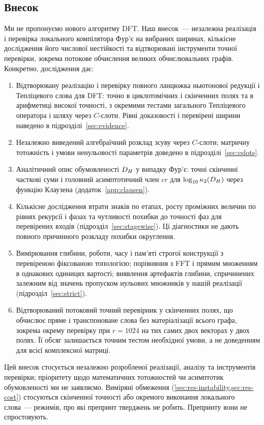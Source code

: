 \documentclass[11pt]{article}
\theoremstyle{plain}
\begin{document}
\subsection{Внесок}
Ми не пропонуємо нового алгоритму DFT. Наш внесок~--- незалежна реалізація і перевірка локального компілятора Фур'є на вибраних ширинах, кількісне дослідження його числової нестійкості та відтворювані інструменти точної перевірки, зокрема потокове обчислення великих обчислювальних графів. Конкретно, дослідження дає:
\begin{enumerate}
\item[(а)] Відтворювану реалізацію і перевірку повного ланцюжка ньютонової редукції і Тепліцевого слова для DFT: точно в циклотомічних і скінченних полях та в арифметиці високої точності, з окремими тестами загального Тепліцевого оператора і шляху через $C$-слоти. Рівні доказовості і перевірені ширини наведено в підрозділі~\ref{sec:evidence}.
\item[(б)] Незалежно виведений алгебраїчний розклад зсуву через $C$-слоти; матричну тотожність і умови ненульовості параметрів доведено в підрозділі~\ref{sec:cslots}.
\item[(в)] Аналітичний опис обумовленості $D_H$ у випадку Фур'є: точні скінченні часткові суми і головний асимптотичний член $cr$ для $\log_{10}\kappa_2(D_H)$ через функцію Клаузена (додаток~\ref{app:clausen}).
\item[(г)] Кількісне дослідження втрати знаків по етапах, росту проміжних величин по рівнях рекурсії і фазах та чутливості похибки до точності фаз для перевірених входів (підрозділ~\ref{sec:stagewise}). Ці діагностики не дають повного причинного розкладу похибки округлення.
\item[(д)] Вимірювання глибини, роботи, часу і пам'яті строгої конструкції з перевіреною фіксованою топологією; порівняння з FFT і прямим множенням в однакових одиницях вартості; виявлення артефактів глибини, спричинених залежним від значень пропуском нульових множників у нашій реалізації (підрозділ~\ref{sec:strict}).
\item[(е)] Відтворюваний потоковий точний перевірник у скінченних полях, що обчислює пряме і транспоноване слова без матеріалізації всього графа, зокрема окрему перевірку при $r=1024$ на тих самих двох векторах у двох полях. Її обсяг залишається точним тестом необхідної умови, а не доведенням для всієї комплексної матриці.
\end{enumerate}
Цей внесок стосується незалежно розробленої реалізації, аналізу та інструментів перевірки; пріоритету щодо математичних тотожностей чи асимптотик обумовленості ми не заявляємо. Виміряні обмеження (\cref{sec:res-instability,sec:res-cost}) стосуються скінченної точності або окремого виконання локального слова~--- режимів, про які препринт тверджень не робить. Препринту вони не спростовують.
\end{document}
